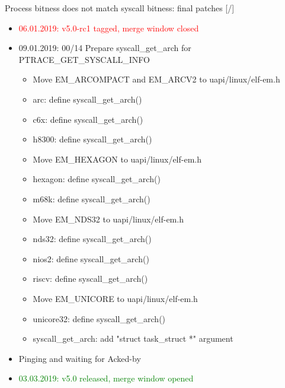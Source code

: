 \documentclass[unicode,aspectratio=169]{beamer}
\begin{document}
\begin{frame}{Process bitness does not match syscall bitness: final patches \hfill [\insertframenumber/\inserttotalframenumber]}
\Large
\begin{itemize}
	\item \textcolor{red}{06.01.2019: v5.0-rc1 tagged, merge window closed}
	\item 09.01.2019: 00/14 Prepare syscall\_get\_arch for PTRACE\_GET\_SYSCALL\_INFO
	\begin{itemize}
		\scriptsize
		\item Move EM\_ARCOMPACT and EM\_ARCV2 to uapi/linux/elf-em.h
		\item arc: define syscall\_get\_arch()
		\item c6x: define syscall\_get\_arch()
		\item h8300: define syscall\_get\_arch()
		\item Move EM\_HEXAGON to uapi/linux/elf-em.h
		\item hexagon: define syscall\_get\_arch()
		\item m68k: define syscall\_get\_arch()
		\item Move EM\_NDS32 to uapi/linux/elf-em.h
		\item nds32: define syscall\_get\_arch()
		\item nios2: define syscall\_get\_arch()
		\item riscv: define syscall\_get\_arch()
		\item Move EM\_UNICORE to uapi/linux/elf-em.h
		\item unicore32: define syscall\_get\_arch()
		\item syscall\_get\_arch: add "struct task\_struct *" argument
	\end{itemize}
	\item Pinging and waiting for Acked-by
	\item \textcolor{green}{03.03.2019: v5.0 released, merge window opened}
\end{itemize}
\end{frame}
\end{document}
